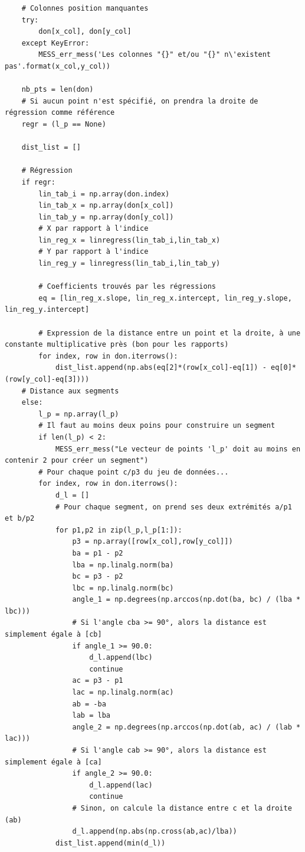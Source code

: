 \documentclass[12pt]{article}
\begin{document}
\begin{lstlisting}
    # Colonnes position manquantes
    try:
        don[x_col], don[y_col]
    except KeyError:
        MESS_err_mess('Les colonnes "{}" et/ou "{}" n\'existent pas'.format(x_col,y_col))
    
    nb_pts = len(don)
    # Si aucun point n'est spécifié, on prendra la droite de régression comme référence
    regr = (l_p == None)
    
    dist_list = []
    
    # Régression
    if regr:
        lin_tab_i = np.array(don.index)
        lin_tab_x = np.array(don[x_col])
        lin_tab_y = np.array(don[y_col])
        # X par rapport à l'indice
        lin_reg_x = linregress(lin_tab_i,lin_tab_x)
        # Y par rapport à l'indice
        lin_reg_y = linregress(lin_tab_i,lin_tab_y)
        
        # Coefficients trouvés par les régressions
        eq = [lin_reg_x.slope, lin_reg_x.intercept, lin_reg_y.slope, lin_reg_y.intercept]
        
        # Expression de la distance entre un point et la droite, à une constante multiplicative près (bon pour les rapports)
        for index, row in don.iterrows():
            dist_list.append(np.abs(eq[2]*(row[x_col]-eq[1]) - eq[0]*(row[y_col]-eq[3])))
    # Distance aux segments
    else:
        l_p = np.array(l_p)
        # Il faut au moins deux poins pour construire un segment
        if len(l_p) < 2:
            MESS_err_mess("Le vecteur de points 'l_p' doit au moins en contenir 2 pour créer un segment")
        # Pour chaque point c/p3 du jeu de données...
        for index, row in don.iterrows():
            d_l = []
            # Pour chaque segment, on prend ses deux extrémités a/p1 et b/p2
            for p1,p2 in zip(l_p,l_p[1:]):
                p3 = np.array([row[x_col],row[y_col]])
                ba = p1 - p2
                lba = np.linalg.norm(ba)
                bc = p3 - p2
                lbc = np.linalg.norm(bc)
                angle_1 = np.degrees(np.arccos(np.dot(ba, bc) / (lba * lbc)))
                # Si l'angle cba >= 90°, alors la distance est simplement égale à [cb]
                if angle_1 >= 90.0:
                    d_l.append(lbc)
                    continue
                ac = p3 - p1
                lac = np.linalg.norm(ac)
                ab = -ba
                lab = lba
                angle_2 = np.degrees(np.arccos(np.dot(ab, ac) / (lab * lac)))
                # Si l'angle cab >= 90°, alors la distance est simplement égale à [ca]
                if angle_2 >= 90.0:
                    d_l.append(lac)
                    continue
                # Sinon, on calcule la distance entre c et la droite (ab)
                d_l.append(np.abs(np.cross(ab,ac)/lba))
            dist_list.append(min(d_l))
    

\end{lstlisting}
\end{document}
